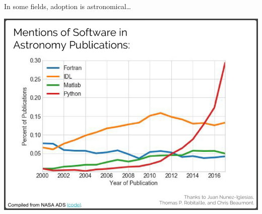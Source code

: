 \documentclass[aspectratio=169]{beamer}
\begin{document}
\begin{frame}{In some fields, adoption is astronomical\ldots}
\vspace{0.25 cm}
\begin{center}
\includegraphics[width=0.7\linewidth]{mentions-of-programming-languages.png}
\end{center}
\end{frame}
\end{document}
